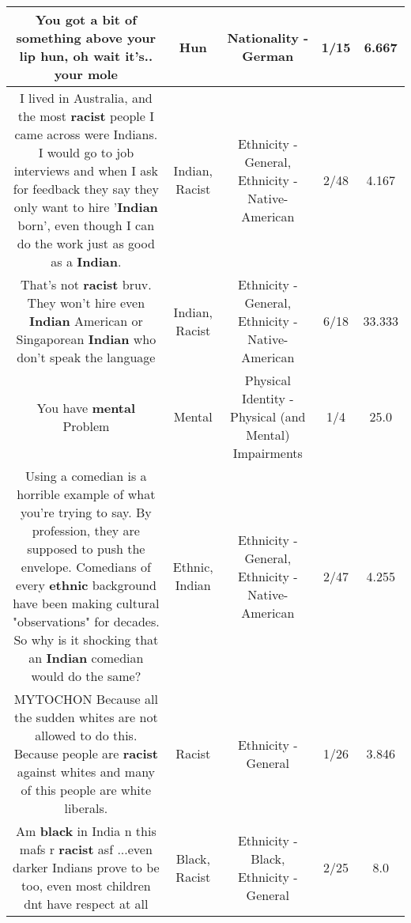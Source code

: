 \documentclass[11pt]{article}
\newlength\mylength
\begin{document}
\begin{center}
\begin{longtable}{|C{.65\mylength}|C{.30\mylength}|C{.12\mylength}|C{.12\mylength}|C{.12\mylength}|}
  \small You got a bit of something above your lip \textbf{hun}, oh wait it's.. your mole\normalsize   & Hun & Nationality - German & 1/15 & 6.667 \\  \hline
  \small I lived in Australia, and the most \textbf{racist} people I came across were Indians. I would go to job  interviews  and when I ask for feedback they say they only want to hire '\textbf{Indian} born', even though I can do the work just as good as a \textbf{Indian}.\normalsize   & Indian, Racist & Ethnicity - General, Ethnicity - Native-American & 2/48 & 4.167 \\  \hline
  \small That's not \textbf{racist} bruv. They won't hire even \textbf{Indian} American or Singaporean \textbf{Indian} who don't speak the language\normalsize   & Indian, Racist & Ethnicity - General, Ethnicity - Native-American & 6/18 & 33.333 \\  \hline
  \small You have \textbf{mental} Problem\normalsize   & Mental & Physical Identity - Physical (and Mental) Impairments & 1/4 & 25.0 \\  \hline
  \small Using a comedian is a horrible example of what you're trying to say.  By profession, they are supposed to push the envelope.  Comedians of every \textbf{ethnic} background have been making cultural "observations" for decades. So why is it shocking that an \textbf{Indian} comedian would do the same?\normalsize   & Ethnic, Indian & Ethnicity - General, Ethnicity - Native-American & 2/47 & 4.255 \\  \hline
  \small MYTOCHON Because all the sudden whites are not allowed to do this. Because people are \textbf{racist} against whites and many of this people are white liberals.\normalsize   & Racist & Ethnicity - General & 1/26 & 3.846 \\  \hline
  \small Am \textbf{black} in India n this mafs r \textbf{racist} asf ...even darker Indians prove to be too, even most children dnt have respect at all\normalsize   & Black, Racist & Ethnicity - Black, Ethnicity - General & 2/25 & 8.0 \\  \hline

\end{longtable}
\end{center}
\end{document}
